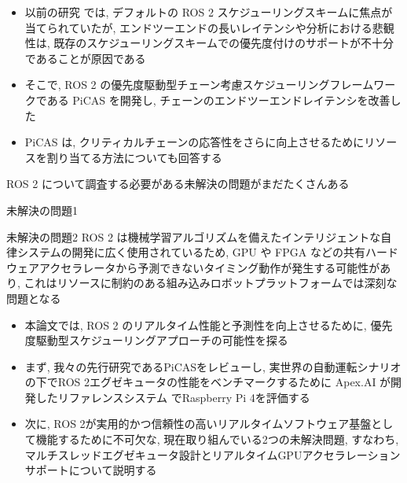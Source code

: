 \begin{frame}{}
    \begin{itemize}
        \item 以前の研究 \cite{casini2019response, blass2021ros} では, デフォルトの ROS 2 スケジューリングスキームに焦点が当てられていたが, エンドツーエンドの長いレイテンシや分析における悲観性は, 既存のスケジューリングスキームでの優先度付けのサポートが不十分であることが原因である
        \item そこで, ROS 2 の優先度駆動型チェーン考慮スケジューリングフレームワークである PiCAS \cite{choi2021picas} を開発し, チェーンのエンドツーエンドレイテンシを改善した
        \item PiCAS は, クリティカルチェーンの応答性をさらに向上させるためにリソースを割り当てる方法についても回答する
    \end{itemize}
\end{frame}

\begin{frame}{}
    ROS 2 について調査する必要がある未解決の問題がまだたくさんある
\end{frame}

\begin{frame}{未解決の問題1}
\end{frame}

\begin{frame}{未解決の問題2}
    ROS 2 は機械学習アルゴリズムを備えたインテリジェントな自律システムの開発に広く使用されているため, GPU や FPGA などの共有ハードウェアアクセラレータから予測できないタイミング動作が発生する可能性があり, これはリソースに制約のある組み込みロボットプラットフォームでは深刻な問題となる
\end{frame}


\begin{frame}{}
    \begin{itemize}
        \item 本論文では, ROS 2 のリアルタイム性能と予測性を向上させるために, 優先度駆動型スケジューリングアプローチの可能性を探る
        \item まず, 我々の先行研究であるPiCASをレビューし, 実世界の自動運転シナリオの下でROS 2エグゼキュータの性能をベンチマークするために Apex.AI が開発したリファレンスシステム でRaspberry Pi 4を評価する
        \item 次に, ROS 2が実用的かつ信頼性の高いリアルタイムソフトウェア基盤として機能するために不可欠な, 現在取り組んでいる2つの未解決問題, すなわち, マルチスレッドエグゼキュータ設計とリアルタイムGPUアクセラレーションサポートについて説明する
    \end{itemize}
\end{frame}
